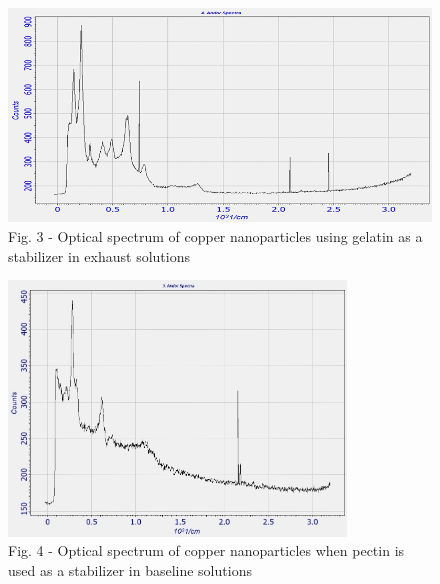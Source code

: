 \begin{figure}[H]
	\centering
	\includegraphics[width=\textwidth]{assets/15}
	\caption*{Fig. 3 - Optical spectrum of copper nanoparticles using gelatin as a stabilizer in exhaust solutions}
\end{figure}

\begin{figure}[H]
	\centering
	\includegraphics[width=0.8\textwidth]{assets/16}
	\caption*{Fig. 4 - Optical spectrum of copper nanoparticles when pectin is used as a stabilizer in baseline solutions}
\end{figure}

